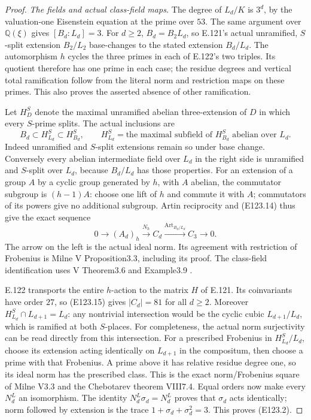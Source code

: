 \begin{proof}
\emph{The fields and actual class-field maps.}
The degree of $L_d/K$ is $3^d$, by the valuation-one Eisenstein
equation at the prime over $53$. The same argument over
$\mathbb Q(\xi)$ gives $[B_d:L_d]=3$. For $d\ge2$,
$B_d=B_2L_d$, so E.121's actual unramified, $S$-split extension
$B_2/L_2$ base-changes to the stated extension $B_d/L_d$.
The automorphism $h$ cycles the three primes in each of E.122's
two triples. Its quotient therefore has one prime in each case;
the residue degrees and vertical total ramification follow from
the literal norm and restriction maps on these primes. This also
proves the asserted absence of other ramification.

Let $H_D^S$ denote the maximal unramified abelian three-extension
of $D$ in which every $S$-prime splits. The actual inclusions are
\[
 B_d\subset H_{L_d}^S\subset H_{B_d}^S,\qquad
 H_{L_d}^S=\text{the maximal subfield of }H_{B_d}^S
                        \text{ abelian over }L_d .
 \tag{E123.14}
\]
Indeed unramified and $S$-split extensions remain so under base
change. Conversely every abelian intermediate field over $L_d$
in the right side is unramified and $S$-split over $L_d$,
because $B_d/L_d$ has those properties.
For an extension of a group $A$ by a cyclic group generated by $h$,
with $A$ abelian, the commutator subgroup is $(h-1)A$:
choose one lift of $h$ and commute it with $A$; commutators of
its powers give no additional subgroup. Artin reciprocity and
(E123.14) thus give the exact sequence
\[
 0\longrightarrow (A_d)_h\xrightarrow{N_h}C_d
       \xrightarrow{\operatorname{Art}_{B_d/L_d}}C_3
       \longrightarrow0.
 \tag{E123.15}
\]
The arrow on the left is the actual ideal norm. Its agreement
with restriction of Frobenius is Milne V Proposition3.3, including
its proof. The class-field identification uses V Theorem3.6
and Example3.9 \cite{E_MilneCFT}.

E.122 transports the entire $h$-action to the matrix $H$ of E.121.
Its coinvariants have order $27$, so (E123.15) gives $|C_d|=81$
for all $d\ge2$. Moreover
$H_{L_d}^S\cap L_{d+1}=L_d$: any nontrivial intersection would be
the cyclic cubic $L_{d+1}/L_d$, which is ramified at both
$S$-places. For completeness, the actual norm surjectivity can
be read directly from this intersection. For a prescribed
Frobenius in $H_{L_d}^S/L_d$, choose its extension acting identically
on $L_{d+1}$ in the compositum, then choose a prime with that
Frobenius. A prime above it has relative residue degree one,
so its ideal norm has the prescribed class.
This is the exact norm/Frobenius square of Milne V3.3 and the
Chebotarev theorem VIII7.4. Equal orders now make every $N_d^L$
an isomorphism. The identity $N_d^L\sigma_d=N_d^L$ proves that
$\sigma_d$ acts identically; norm followed by extension is
the trace $1+\sigma_d+\sigma_d^2=3$. This proves (E123.2).


\end{proof}
